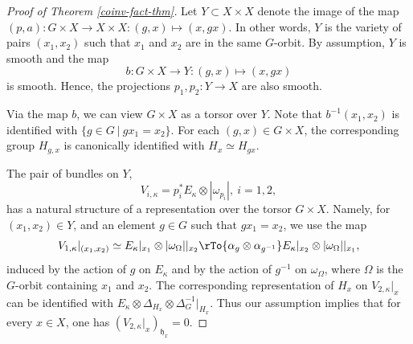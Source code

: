\documentclass[12pt,reqno]{amsart}
\theoremstyle{definition}
\theoremstyle{remark}
\numberwithin{equation}{section}
\newcommand{\De}{\Delta}
\newcommand{\ot}{\otimes}
\newcommand{\Om}{\Omega}
\renewcommand{\SS}{{\mathcal S}}
\newcommand{\sub}{\subset}
\newcommand{\om}{\omega}
\renewcommand{\a}{\alpha}
\newcommand{\fg}{{\mathfrak g}}
\newcommand{\fh}{{\mathfrak h}}
\begin{document}
\begin{proof}[Proof of Theorem \ref{coinv-fact-thm}]
Let $Y\sub X\times X$ denote the image of the map $(p,a):G\times X\to X\times X: (g,x)\mapsto (x,gx)$. 
In other words, $Y$ is the variety of pairs $(x_1,x_2)$ such that $x_1$ and $x_2$ are in the same $G$-orbit.
By assumption, $Y$ is smooth and the map 
$$b:G\times X\to Y:(g,x)\mapsto (x,gx)$$ 
is smooth. Hence, the projections $p_1,p_2:Y\to X$ are also smooth.

Via the map $b$, we can view $G\times X$ as a torsor over $Y$. Note that $b^{-1}(x_1,x_2)$ is identified with $\{g\in G \ |\ gx_1=x_2\}$.
For each $(g,x)\in G\times X$, the corresponding group $H_{g,x}$ is canonically identified with $H_x\simeq H_{gx}$.

The pair of bundles on $Y$,
$$V_{i,\kappa}=p_i^*E_{\kappa}\ot |\om_{p_i}|, \ i=1,2,$$
has a natural structure of a representation over the torsor $G\times X$. Namely, 
for $(x_1,x_2)\in Y$, and an element $g\in G$ such that $gx_1=x_2$, we use the map
$$V_{1,\kappa}|_{(x_1,x_2)}\simeq E_{\kappa}|_{x_1}\ot |\om_{\Om}||_{x_2}\rTo{\a_g\ot \a_{g^{-1}}} E_{\kappa}|_{x_2}\ot |\om_{\Om}||_{x_1},$$
induced by the action of $g$ on $E_{\kappa}$ and by the action of $g^{-1}$ on $\om_{\Om}$, where $\Om$ is the $G$-orbit containing $x_1$ and $x_2$.
The corresponding representation of $H_x$ on $V_{2,\kappa}|_x$ can be identified with $E_{\kappa}\ot \De_{H_x}\ot \De_G^{-1}|_{H_x}$. 
Thus our assumption implies that for every $x\in X$, one has $(V_{2,\kappa}|_x)_{\fh_x}=0$.


\end{proof}
\end{document}
